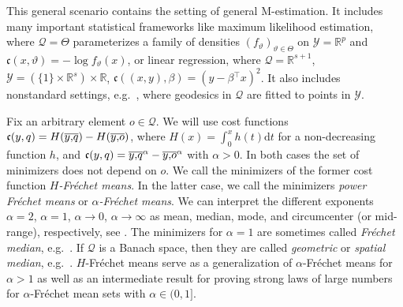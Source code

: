 \documentclass{scrartcl}
\newcommand*{\mc}[1]{\mathcal{#1}}
\newcommand*{\mf}[1]{\mathfrak{#1}}
\newcommand{\R}{\mathbb{R}}
\newcommand{\transpose}{\!^\top\!}
\newcommand{\tr}{\transpose}
\newcommand{\dl}{\mathrm{d}}
\theoremstyle{plain}\newtheorem{theorem}{Theorem}[section]
\theoremstyle{definition}
\theoremstyle{remark}
\begin{document}
This general scenario contains the setting of general M-estimation. It includes many important statistical frameworks like maximum likelihood estimation, where $\mc Q = \Theta$ parameterizes a family of densities $(f_\vartheta)_{\vartheta\in\Theta}$ on $\mc Y = \R^p$ and $\mf c(x,\vartheta) = -\log f_{\vartheta}(x)$, or linear regression, where $\mc Q = \R^{s+1}$, $\mc Y = (\{1\}\times\R^s) \times \R$, $\mf c((x,y),\beta) = (y - \beta\tr x)^2$. It also includes nonstandard settings, e.g.\ \cite{huckemann11}, where geodesics in $\mc Q$ are fitted to points in $\mc Y$.

Fix an arbitrary element $o\in\mc Q$. We will use cost functions $\mf c(y, q) = H(\ol yq)-H(\ol yo)$, where $H(x) = \int_0^x h(t) \dl t$ for a non-decreasing function $h$, and $\mf c(y, q) = \ol yq^\alpha-\ol yo^\alpha$ with $\alpha>0$. In both cases the set of minimizers does not depend on $o$. We call the minimizers of the former cost function \textit{$H$-Fréchet means}. In the latter case, we call the minimizers \textit{power Fréchet means} or \textit{$\alpha$-Fréchet means}. We can interpret the different exponents $\alpha = 2$, $\alpha =1$, $\alpha \to 0$, $\alpha \to \infty$ as mean, median, mode, and circumcenter (or mid-range), respectively, see \cite{macqueen67}. The minimizers for $\alpha=1$ are sometimes called \textit{Fréchet median}, e.g.\ \cite{arnaudon13}. If $\mc Q$ is a Banach space, then they are called \textit{geometric} or \textit{spatial median}, e.g.\ \cite{kemperman87}.
$H$-Fréchet means serve as a generalization of $\alpha$-Fréchet means for $\alpha>1$ as well as an intermediate result for proving strong laws of large numbers for $\alpha$-Fréchet mean sets with $\alpha\in(0,1]$.
\end{document}
